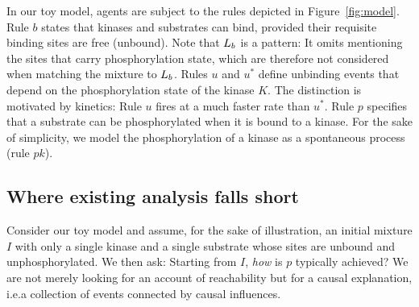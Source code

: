 \longversion{}

In our toy model, agents are subject to the rules depicted in
Figure~\ref{fig:model}. Rule $b$ states that kinases and substrates
can bind, provided their requisite binding sites are free
(unbound). Note that $L_{b}$ is a pattern: It omits mentioning the
sites that carry phosphorylation state, which are therefore not
considered when matching the mixture to $L_{b}$. Rules $u$ and
$u^{*}$ define unbinding events that depend on the phosphorylation
state of the kinase $K$. The distinction is motivated by kinetics:
Rule $u$ fires at a much faster rate than $u^{*}$. Rule $p$ specifies
that a substrate can be phosphorylated when it is bound to a
kinase. For the sake of simplicity, we model the phosphorylation of a
kinase as a spontaneous process (rule $pk$).

\subsection{Where existing analysis falls short}
\label{subsec:dumb-story}


Consider our toy model and assume, for the
sake of illustration, an initial mixture $I$ with only a single kinase
and a single substrate whose sites are unbound and
unphosphorylated. We then ask: Starting from $I$, \emph{how} is $p$ typically achieved? We are not merely looking for an account of
reachability but for a causal explanation, i.e.\@ a collection of events connected by causal influences.


